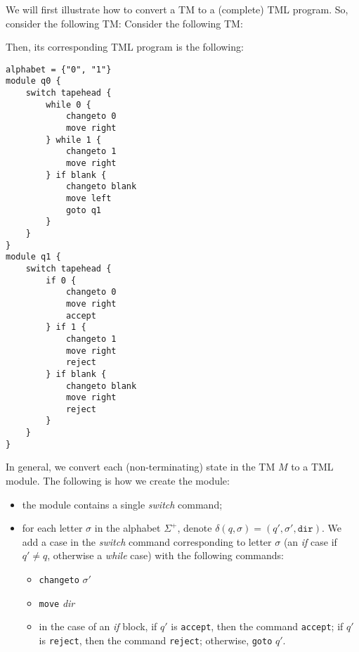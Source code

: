 We will first illustrate how to convert a TM to a (complete) TML program. So, consider the following TM:
Consider the following TM:
\begin{figure}[H]
    \centering
\end{figure}
Then, its corresponding TML program is the following:
\begin{lstlisting}[language=TML]
alphabet = {"0", "1"}
module q0 {
    switch tapehead {
        while 0 {
            changeto 0
            move right
        } while 1 {
            changeto 1
            move right
        } if blank {
            changeto blank
            move left
            goto q1
        }
    }
}
module q1 {
    switch tapehead {
        if 0 {
            changeto 0
            move right
            accept
        } if 1 {
            changeto 1
            move right
            reject
        } if blank {
            changeto blank
            move right
            reject
        }
    }
}
\end{lstlisting}
In general, we convert each (non-terminating) state in the TM $M$ to a TML module. The following is how we create the module:
\begin{itemize}
    \item the module contains a single \textit{switch} command;
    \item for each letter $\sigma$ in the alphabet $\Sigma^+$, denote $\delta(q, \sigma) = (q', \sigma', \texttt{dir})$. We add a case in the \textit{switch} command corresponding to letter $\sigma$ (an \textit{if} case if $q' \neq q$, otherwise a \textit{while} case) with the following commands:
    \begin{itemize}
        \item \texttt{changeto} $\sigma'$
        \item \texttt{move} \textit{dir}
        \item in the case of an \textit{if} block, if $q'$ is \texttt{accept}, then the command \texttt{accept}; if $q'$ is \texttt{reject}, then the command \texttt{reject}; otherwise, \texttt{goto} $q'$.
    \end{itemize}
\end{itemize}
